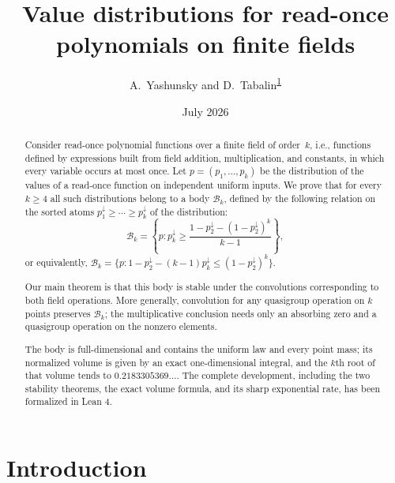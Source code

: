 \documentclass[11pt]{article}
\title{Value distributions for read-once polynomials on finite fields}
\author{A.~Yashunsky and
D.~Tabalin\textsuperscript{\hyperlink{author-contributions}{1}}}
\date{July 2026}
\theoremstyle{definition}
\theoremstyle{remark}
\newcommand{\body}{\mathcal{B}}
\newcommand{\down}{\downarrow}
\begin{document}
\maketitle
{}
\setcounter{footnote}{1}

\begin{abstract}
Consider read-once polynomial functions over a finite field of
order~$k$, i.e., functions defined by expressions built from field
addition, multiplication, and constants, in which every variable
occurs at most once. Let $p=(p_1,\dots,p_k)$ be the distribution of
the values of a read-once function on independent uniform inputs.
We prove that for every $k\ge4$ all such distributions belong to a
body $\body_k$, defined by the following relation on the sorted
atoms $p_1^\down\ge\cdots\ge p_k^\down$ of the distribution:
\[
  \body_k=\left\{p:p_k^\down\ge
  \frac{1-p_2^\down-(1-p_2^\down)^k}{k-1}\right\},
\]
or equivalently,
$\body_k = \{ p \colon 1-p_2^\down-(k-1)p_k^\down\le(1-p_2^\down)^k\}$.

Our main theorem is that this body is stable under the convolutions
corresponding to both field operations.  More generally, convolution
for any quasigroup operation on $k$ points preserves $\body_k$; the
multiplicative conclusion needs only an absorbing zero and a
quasigroup operation on the nonzero elements.

The body is full-dimensional and contains the uniform law and every
point mass; its normalized volume is given by an exact one-dimensional
integral, and the $k$th root of that volume tends to
$0.2183305369\ldots$.  The complete development, including
the two stability theorems, the exact volume formula, and its sharp exponential rate,
has been formalized in Lean 4.
\end{abstract}

\section{Introduction}\label{sec:introduction}
\end{document}
